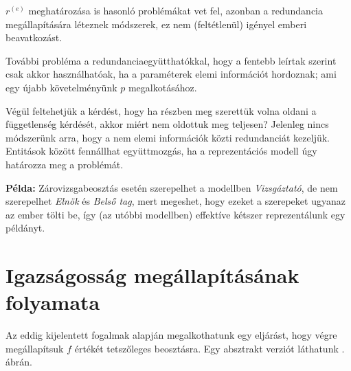 \documentclass[twocolumn]{article}
\theoremstyle{definition}
\newcommand{\pl}{ \textbf{Példa:} }
\newcommand{\ent}[2]{ {#1}^{(#2)} }
\begin{document}
    $\ent r e$ meghatározása is hasonló problémákat vet fel, azonban a redundancia megállapítására léteznek módszerek, ez nem (feltétlenül) igényel emberi beavatkozást.
    
    További probléma a redundanciaegyütthatókkal, hogy a fentebb leírtak szerint csak akkor használhatóak, ha a paraméterek elemi információt hordoznak; ami egy újabb követelményünk $p$ megalkotásához.
    
    Végül feltehetjük a kérdést, hogy ha részben meg szerettük volna oldani a függetlenség kérdését, akkor miért nem oldottuk meg teljesen? Jelenleg nincs módszerünk arra, hogy a nem elemi információk közti redundanciát kezeljük. Entitások között fennállhat együttmozgás, ha a reprezentációs modell úgy határozza meg a problémát.
    
    \pl Zárovizsgabeosztás esetén szerepelhet a modellben \textit{Vizsgáztató}, de nem szerepelhet \textit{Elnök} és \textit{Belső tag}, mert megeshet, hogy ezeket a szerepeket ugyanaz az ember tölti be, így (az utóbbi modellben) effektíve kétszer reprezentálunk egy példányt.

\section{Igazságosság megállapításának folyamata}
    Az eddig kijelentett fogalmak alapján megalkothatunk egy eljárást, hogy végre megállapítsuk $f$ értékét tetszőleges beosztásra. Egy absztrakt verziót láthatunk \az{\ref{fig:flow}}. ábrán.
    
\end{document}
